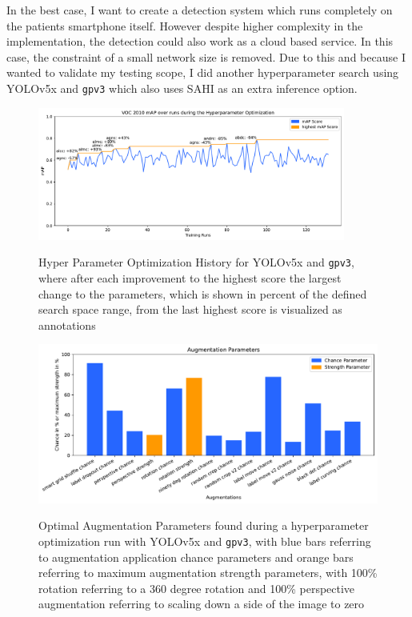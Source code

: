\documentclass[10pt]{book}
\begin{document}
In the best case, I want to create a detection system which runs completely on the patients smartphone itself. However despite higher complexity in the implementation, the detection could also work as a cloud based service. In this case, the constraint of a small network size is removed. Due to this and because I wanted to validate my testing scope, I did another hyperparameter search using \ac{YOLO}v5x and \texttt{gpv3} which also uses \ac{SAHI} as an extra inference option.

\begin{figure}
  \caption{Hyper Parameter Optimization History for \ac{YOLO}v5x and \texttt{gpv3}, where after each improvement to the highest score the largest change to the parameters, which is shown in percent of the defined search space range, from the last highest score is visualized as annotations}
  \includegraphics[width=0.9\textwidth]{image/hyp-param-search-yolov5x_gpv3_hyp_test-history}
  \label{fig:yolov5x_hyp_hist}
\end{figure}

\begin{figure}
  \caption{Optimal Augmentation Parameters found during a hyperparameter optimization run with \ac{YOLO}v5x and \texttt{gpv3}, with blue bars referring to augmentation application chance parameters and orange bars referring to maximum augmentation strength parameters, with 100\% rotation referring to a 360 degree rotation and 100\% perspective augmentation referring to scaling down a side of the image to zero}
  \includegraphics[width=\textwidth]{plot/best_yolov5x_hyp_run_params}
  \label{fig:optimal_yolov5x_augment_params} 
\end{figure}
\end{document}
